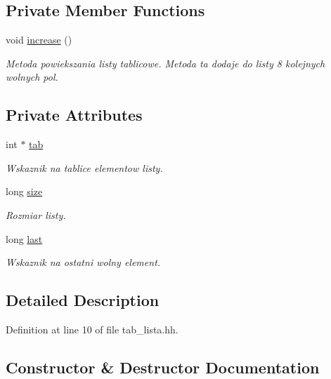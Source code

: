 \subsection*{Private Member Functions}
\begin{DoxyCompactItemize}
\item 
void \hyperlink{class_tab_lista_a9ae6a784d488c8b9885ccbc945225f9e}{increase} ()
\begin{DoxyCompactList}\small\item\em Metoda powiekszania listy tablicowe. Metoda ta dodaje do listy 8 kolejnych wolnych pol. \end{DoxyCompactList}\end{DoxyCompactItemize}
\subsection*{Private Attributes}
\begin{DoxyCompactItemize}
\item 
int $\ast$ \hyperlink{class_tab_lista_a06f658ed62f3db852813e90dcc5876a5}{tab}
\begin{DoxyCompactList}\small\item\em Wskaznik na tablice elementow listy. \end{DoxyCompactList}\item 
long \hyperlink{class_tab_lista_aa3c6d623be318ec8410fa447281380da}{size}
\begin{DoxyCompactList}\small\item\em Rozmiar listy. \end{DoxyCompactList}\item 
long \hyperlink{class_tab_lista_ac7413a3d41c2c2e57fa92e055fc2e5b3}{last}
\begin{DoxyCompactList}\small\item\em Wskaznik na ostatni wolny element. \end{DoxyCompactList}\end{DoxyCompactItemize}


\subsection{Detailed Description}


Definition at line 10 of file tab\+\_\+lista.\+hh.



\subsection{Constructor \& Destructor Documentation}
\hypertarget{class_tab_lista_ad3bfa98306e98b4e5bb7ff524e72078c}{}
